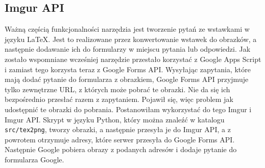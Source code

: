 \subsection{Imgur API}
Ważną częścią funkcjonalności narzędzia jest tworzenie pytań ze wstawkami w języku \LaTeX.
Jest to realizowane przez konwertowanie wstawek do obrazków, a następnie dodawanie ich do 
formularzy w miejscu pytania lub odpowiedzi. Jak zostało wspomniane wcześniej narzędzie
przestało korzystać z Google Apps Script i zamiast tego korzysta teraz z Google Forms API.
Wysyłając zapytania, które mają dodać pytanie do formularza z obrazkiem, Google Forms API
przyjmuje tylko zewnętrzne URL, z których może pobrać te obrazki. Nie da się ich
bezpośrednio przesłać razem z zapytaniem. Pojawił się, więc problem jak udostępnić te
obrazki do pobrania. Postanowiłam wykorzystać do tego Imgur i Imgur API. Skrypt w języku Python,
który można znaleźć w katalogu \texttt{src/tex2png}, tworzy obrazki, a następnie przesyła je 
do Imgur API, a z powrotem otrzymuje adresy, które serwer przesyła do Google Forms API.
Następnie Google pobiera obrazy z podanych adresów i dodaje pytanie do formularza Google.

